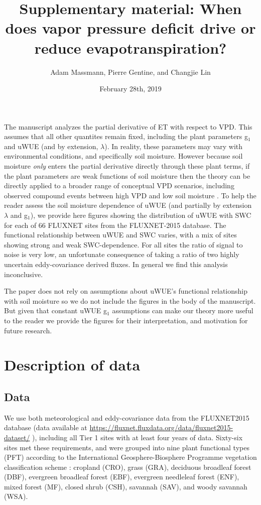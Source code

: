 \documentclass[12pt]{article}
\title{Supplementary material: When does vapor pressure deficit drive or
  reduce evapotranspiration?}
\author{Adam Massmann, Pierre Gentine, and Changjie Lin}
\date{February 28th, 2019}
\begin{document}
\maketitle

The manuscript analyzes the partial derivative of ET with respect to
VPD. This assumes that all other quantites remain fixed, including the
plant parameters g$_1$ and uWUE (and by extension, $\lambda$). In
reality, these parameters may vary with environmental conditions, and
specifically soil moisture. However because soil moisture
\textit{only} enters the partial derivative directly through these
plant terms, if the plant parameters are weak functions of soil
moisture then the theory can be directly applied to a broader range of
conceptual VPD scenarios, including observed compound events between
high VPD and low soil moisture \citep{Zhou_2019}. To help the reader
assess the soil moisture dependence of uWUE (and partially by
extension $\lambda$ and g$_1$), we provide here figures showing the
distribution of uWUE with SWC for each of 66 FLUXNET sites from the
FLUXNET-2015 database. The functional relationship between uWUE and
SWC varies, with a mix of sites showing strong and weak
SWC-dependence. For all sites the ratio of signal to noise is very
low, an unfortunate consequence of taking a ratio of two highly
uncertain eddy-covariance derived fluxes. In general we find this
analysis inconclusive.

The paper does not rely on assumptions about uWUE's functional
relationship with soil moisture so we do not include the figures in
the body of the manuscript. But given that constant uWUE g$_1$
assumptions can make our theory more useful to the reader we provide
the figures for their interpretation, and motivation for future
research.

\section{Description of data}
\subsection{Data}
\label{data}
We use both meteorological and eddy-covariance data from the
FLUXNET2015 database (data available at \sloppy
\url{https://fluxnet.fluxdata.org/data/fluxnet2015-dataset/} \sloppy),
including all Tier 1 sites with at least four years of data. Sixty-six
sites met these requirements, and were grouped into nine plant
functional types (PFT) according to the International
Geosphere-Biosphere Programme vegetation classification scheme
\citep{Loveland_1999}: cropland (CRO), grass (GRA), deciduous
broadleaf forest (DBF), evergreen broadleaf forest (EBF), evergreen
needleleaf forest (ENF), mixed forest (MF), closed shrub (CSH),
savannah (SAV), and woody savannah (WSA).
\end{document}
